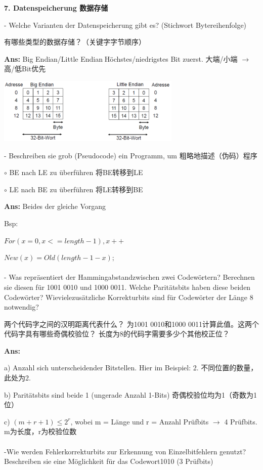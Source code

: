 \documentclass[fleqn]{article}
\begin{document}
\noindent\textbf{7. Datenspeicherung 数据存储}

- Welche Varianten der Datenspeicherung gibt es? (Stichwort Bytereihenfolge)

有哪些类型的数据存储？（关键字字节顺序）

\textbf{Ans:} Big Endian/Little EndianHöchstes/niedrigstes Bit zuerst. 大端/小端 $\rightarrow$ 高/低Bit优先

\begin{center}
    \includegraphics[scale=0.6]{3.png}
\end{center}

- Beschreiben sie grob (Pseudocode) ein Programm, um 粗略地描述（伪码）程序

\qquad $\circ$ BE nach LE zu überführen 将BE转移到LE

\qquad $\circ$ LE nach BE zu überführen 将LE转移到BE

\textbf{Ans:} Beides der gleiche Vorgang

\qquad Bsp: 

\qquad \qquad $For (x=0, x<=length-1),x++$

\qquad \qquad \qquad $New(x)=Old(length-1-x);$
\\
\\
\indent- Was repräsentiert der Hammingabstandzwischen zwei Codewörtern? Berechnen sie diesen für 1001 0010 und 1000 0011. Welche Paritätsbits haben diese beiden Codewörter? Wievielezusätzliche Korrekturbits sind für Codewörter der Länge 8 notwendig?

两个代码字之间的汉明距离代表什么？ 为1001 0010和1000 0011计算此值。这两个代码字具有哪些奇偶校验位？ 长度为8的代码字需要多少个其他校正位？

\textbf{Ans:} 

\qquad a) Anzahl sich unterscheidender Bitstellen. Hier im Beispiel: 2. 不同位置的数量，此处为2.

\qquad b) Paritätsbits sind beide 1 (ungerade Anzahl 1-Bits) 奇偶校验位均为1（奇数为1位）

\qquad c) $(m+r+1)\leq 2^r$, wobei m = Länge und r = Anzahl Prüfbits $\rightarrow$ 4 Prüfbits. m为长度，r为校验位数
\\
\\
\indent-Wie werden Fehlerkorrekturbits zur Erkennung von Einzelbitfehlern genutzt? Beschreiben sie eine Möglichkeit für das Codewort1010 (3 Prüfbits)
\end{document}
